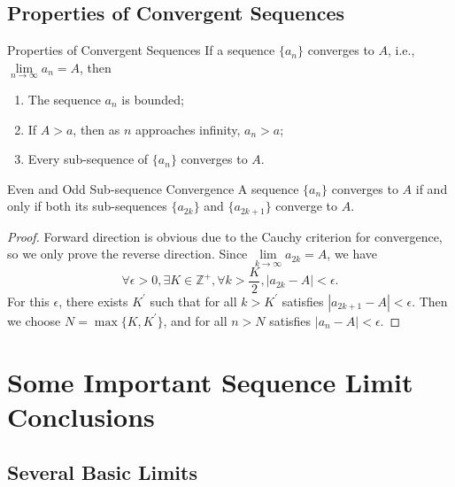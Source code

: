 \subsection{Properties of Convergent Sequences}

\begin{proposition}{Properties of Convergent Sequences}{}
  If a sequence $\{a_n\}$ converges to $A$, i.e.,
  $\lim \limits _{n \rightarrow \infty} a_n = A$, then
  \begin{enumerate}
  \item The sequence $a_n$ is bounded;
  \item If $A > a$, then as $n$ approaches infinity, $a_n > a$;
  \item Every sub-sequence of $\{a_n\}$ converges to $A$.
  \end{enumerate}
\end{proposition}

\begin{theorem}{Even and Odd Sub-sequence Convergence}{}
  A sequence $\{a_n\}$ converges to $A$ if and only if both its sub-sequences
  $\{a_{2k}\}$ and $\{a_{2k+1}\}$ converge to $A$.
\end{theorem}

\begin{proof}
  Forward direction is obvious due to the Cauchy criterion for convergence,
  so we only prove the reverse direction.
  Since $\lim \limits _{k \rightarrow \infty} a_{2k} = A$, we have
  \begin{equation}
    \forall \epsilon > 0, \exists K \in \mathbb{Z}^+, \forall k > \frac{K}{2}, |a_{2k} - A| < \epsilon.
  \end{equation}
  For this $\epsilon$, there exists $K^{\prime}$ such that for all $k >
  K^{\prime}$ satisfies $|a_{2k + 1} - A| < \epsilon$.
  Then we choose $N = \max \{K, K^{\prime}\}$, and for all $n > N$ satisfies
  $|a_n - A| < \epsilon$.
\end{proof}

\section{Some Important Sequence Limit Conclusions}

\subsection{Several Basic Limits}

